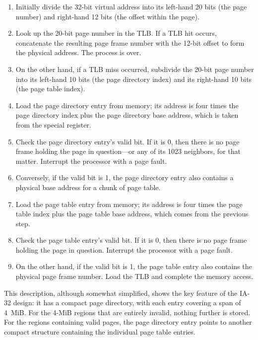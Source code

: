 \begin{enumerate}
\item
Initially divide the 32-bit virtual address into its left-hand 20 bits
(the page number) and right-hand 12 bits (the offset within the page).
\item
Look up the 20-bit page number in the TLB.  If a TLB hit occurs,
concatenate the resulting page frame number with the 12-bit offset to
form the physical address.  The process is over.
\item
On the other hand, if a TLB miss occurred, subdivide the 20-bit page
number into its left-hand 10 bits (the page directory index) and its
right-hand 10 bits (the page table index).
\item
Load the page directory entry from memory; its address is four times
the page directory index plus the page directory base address, which
is taken from the special register.
\item
Check the page directory entry's valid bit.  If it is 0, then there
is no page frame holding the page in question---or any of its 1023
neighbors, for that matter.  Interrupt the processor with a page fault.
\item
Conversely, if the valid bit is 1, the page directory entry
also contains a physical base address for a chunk of page table.
\item
Load the page table entry from memory; its address is four times the
page table index plus the page table base address, which comes from the previous
step.
\item
Check the page table entry's valid bit.  If it is 0, then there is no
page frame holding the page in question.  Interrupt the processor with
a page fault.
\item
On the other hand, if the valid bit is 1, the page table entry also
contains the physical page frame number.  Load the TLB and complete
the memory access.
\end{enumerate}

This description, although somewhat simplified, shows the key
feature of the IA-32 design: it has a compact page directory, with
each entry covering a span of 4~MiB.  For the 4-MiB regions that are
entirely invalid, nothing further is stored.  For the regions
containing valid pages, the page directory entry points to another
compact structure containing the individual page table entries.

